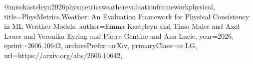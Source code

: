 @misc{kasteleyn2026physmetricsweatherevaluationframeworkphysical,
      title={PhysMetrics.Weather: An Evaluation Framework for Physical Consistency in ML Weather Models}, 
      author={Emma Kasteleyn and Timo Maier and Axel Lauer and Veronika Eyring and Pierre Gentine and Ana Lucic},
      year={2026},
      eprint={2606.10642},
      archivePrefix={arXiv},
      primaryClass={cs.LG},
      url={https://arxiv.org/abs/2606.10642}, 
}
